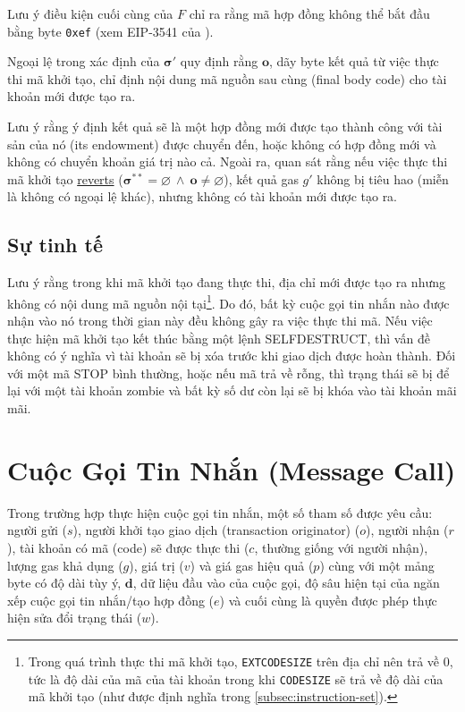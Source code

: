 \documentclass[9pt,oneside]{amsart}
\begin{document}
\begin{multicols}{2}
Lưu ý điều kiện cuối cùng của $F$ chỉ ra rằng mã hợp đồng không thể bắt đầu bằng byte \texttt{0xef} (xem EIP-3541 của \cite{EIP-3541}).

Ngoại lệ trong xác định của $\boldsymbol{\sigma}'$ quy định rằng $\mathbf{o}$, dãy byte kết quả từ việc thực thi mã khởi tạo, chỉ định nội dung mã nguồn sau cùng (final body code) cho tài khoản mới được tạo ra.

Lưu ý rằng ý định kết quả sẽ là một hợp đồng mới được tạo thành công với tài sản của nó (its endowment) được chuyển đến, hoặc không có hợp đồng mới và không có chuyển khoản giá trị nào cả. Ngoài ra, quan sát rằng nếu việc thực thi mã khởi tạo \hyperlink{REVERT}{reverts} ($\boldsymbol{\sigma}^{**} = \varnothing \ \wedge\ \mathbf{o} \neq \varnothing$), kết quả gas $g'$ không bị tiêu hao (miễn là không có ngoại lệ khác), nhưng không có tài khoản mới được tạo ra.

\subsection{Sự tinh tế}
Lưu ý rằng trong khi mã khởi tạo đang thực thi, địa chỉ mới được tạo ra nhưng không có nội dung mã nguồn nội tại\footnote{Trong quá trình thực thi mã khởi tạo, \texttt{EXTCODESIZE} trên địa chỉ nên trả về 0, tức là độ dài của mã của tài khoản trong khi \texttt{CODESIZE} sẽ trả về độ dài của mã khởi tạo (như được định nghĩa trong \ref{subsec:instruction-set}).}. Do đó, bất kỳ cuộc gọi tin nhắn nào được nhận vào nó trong thời gian này đều không gây ra việc thực thi mã. Nếu việc thực hiện mã khởi tạo kết thúc bằng một lệnh {\small SELFDESTRUCT}, thì vấn đề không có ý nghĩa vì tài khoản sẽ bị xóa trước khi giao dịch được hoàn thành. Đối với một mã {\small STOP} bình thường, hoặc nếu mã trả về rỗng, thì trạng thái sẽ bị để lại với một tài khoản zombie và bất kỳ số dư còn lại sẽ bị khóa vào tài khoản mãi mãi.

\section{Cuộc Gọi Tin Nhắn (Message Call)} \label{ch:call}
Trong trường hợp thực hiện cuộc gọi tin nhắn, một số tham số được yêu cầu: người gửi ($s$), người khởi tạo giao dịch (transaction originator) ($o$), người nhận ($r$), tài khoản có mã (code) sẽ được thực thi ($c$, thường giống với người nhận), lượng gas khả dụng ($g$), giá trị ($v$) và giá gas hiệu quả ($p$) cùng với một mảng byte có độ dài tùy ý, $\mathbf{d}$, dữ liệu đầu vào của cuộc gọi, độ sâu hiện tại của ngăn xếp cuộc gọi tin nhắn/tạo hợp đồng ($e$) và cuối cùng là quyền được phép thực hiện sửa đổi trạng thái ($w$).


\end{multicols}
\end{document}
